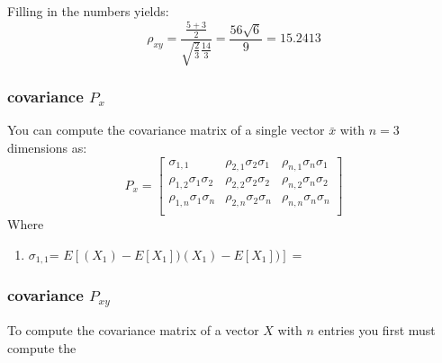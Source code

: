 Filling in the numbers yields:
\begin{equation}
    \rho_{xy}=\frac{\frac{5+3}{2}}{\sqrt{\frac{2}{3}}\frac{14}{3}}=\frac{56\sqrt{6}}{9}=15.2413
\end{equation}

\subsubsection{covariance $P_{x}$}
You can compute the covariance matrix of a single vector $\bar{x}$ with $n=3$ dimensions as:
\begin{equation}
    P_x=
    \begin{bmatrix}
            \sigma_{1,1} & \rho_{2,1}\sigma_{2}\sigma_{1} &\rho_{n,1}\sigma_{n}\sigma_{1}\\
            \rho_{1,2}\sigma_{1}\sigma_{2} & \rho_{2,2}\sigma_{2}\sigma_{2} &\rho_{n,2}\sigma_{n}\sigma_{2}\\
            \rho_{1,n}\sigma_{1}\sigma_{n} & \rho_{2,n}\sigma_{2}\sigma_{n} &\rho_{n,n}\sigma_{n}\sigma_{n}\\
    \end{bmatrix}
\end{equation}
Where
\begin{enumerate}
    \item $\sigma_{1,1}$= $E[(X_1)-E[X_1])(X_1)-E[X_1])]=\frac{}{}$ \cite{covariance_matrix}
\end{enumerate}
\subsubsection{covariance $P_{xy}$}
To compute the covariance matrix of a vector $X$ with $n$ entries you first must compute the 



\newpage
